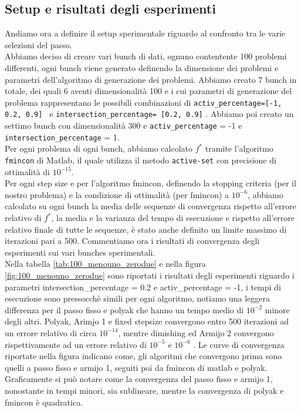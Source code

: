 \documentclass[12pt]{extarticle}
\begin{document}
\subsection{Setup e risultati degli esperimenti}
Andiamo ora a definire il setup sperimentale riguardo al confronto tra le varie selezioni del passo.\\
Abbiamo deciso di creare vari bunch di dati, ognuno contentente 100 problemi differenti, ogni bunch viene generato definendo la dimensione dei problemi e parametri dell'algoritmo di generazione dei problemi. Abbiamo creato 7 bunch in totale, dei quali 6 aventi dimensionalità 100 e i cui parametri di generazione del problema rappresentano le possibili combinazioni di \texttt{activ\_percentage=[-1, 0.2, 0.9] } e \texttt{intersection\_percentage= [0.2, 0.9]} . Abbiamo poi creato un settimo bunch con dimensionalità 300 e \texttt{activ\_percentage} = -1 e  \texttt{intersection\_percentage} = 1.\\
Per ogni problema di ogni bunch, abbiamo calcolato $f^*$ tramite l'algoritmo \texttt{fmincon} di Matlab, il quale utilizza il metodo \texttt{active-set} con precisione di ottimalità di $10^{-15}$.\\
Per ogni step size e per l'algoritmo fmincon, definendo la stopping criteria (per il nostro problema) e la condizione di ottimalità (per fmincon) a $10^{-6}$, abbiamo calcolato su ogni bunch la media delle sequenze di convergenza rispetto all'errore relativo di $f^*$, la media e la varianza del tempo di esecuzione e rispetto all'errore relativo finale di tutte le sequenze, è stato anche definito un limite massimo di iterazioni pari a 500. Commentiamo ora i risultati di convergenza degli esperimenti sui vari bunches sperimentali. \\
Nella tabella \ref{tab:100_menouno_zerodue} e nella figura \ref{fig:100_menouno_zerodue} sono riportati i risultati degli esperimenti riguardo i parametri intersection\_percentage = 0.2 e activ\_percentage = -1, i tempi di esecuzione sono pressocchè simili per ogni algoritmo, notiamo una leggera differenza per il passo fisso e polyak che hanno un tempo medio di $10^{-2}$ minore degli altri.  Polyak, Arimjo 1 e fixed stepsize convergono entro 500 iterazioni ad un errore relativo di circa $10^{-14}$, mentre dimishing ed Armijo 2 convergono rispettivamente ad un errore relativo di $10^{-5}$ e $10^{-6}$ . Le curve di convergenza riportate nella figura indicano come, gli algoritmi che convergono prima sono quelli a passo fisso e armijo 1, seguiti poi da fmincon di matlab e polyak. Graficamente si può notare come la convergenza del passo fisso e armijo 1, nonostante in tempi minori, sia sublineare, mentre la convergenza di polyak e fmincon è quadratica.\\
\end{document}
